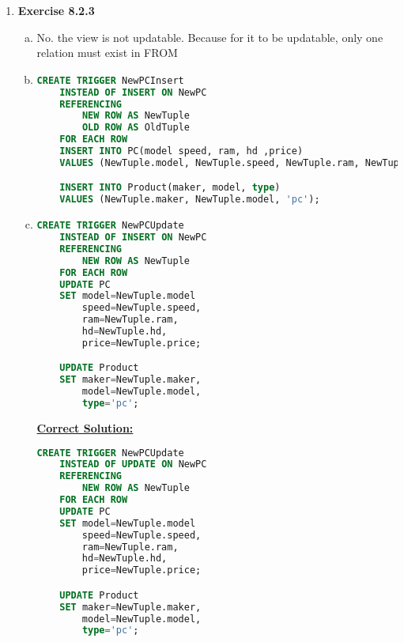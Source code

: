 \documentclass[12pt]{article}
\begin{document}
\begin{enumerate}[1.]
    \item \textbf{Exercise 8.2.3}

    \bigskip

    \begin{enumerate}[a)]
        \item No. the view is not updatable. Because for it to be updatable,
        only one relation must exist in FROM
        \item

    \begin{lstlisting}[language=SQL]
    CREATE TRIGGER NewPCInsert
    INSTEAD OF INSERT ON NewPC
    REFERENCING
        NEW ROW AS NewTuple
        OLD ROW AS OldTuple
    FOR EACH ROW
    INSERT INTO PC(model speed, ram, hd ,price)
    VALUES (NewTuple.model, NewTuple.speed, NewTuple.ram, NewTuple.hd, NewTuple.price);

    INSERT INTO Product(maker, model, type)
    VALUES (NewTuple.maker, NewTuple.model, 'pc');
    \end{lstlisting}

        \item

    \begin{lstlisting}[language=SQL]
    CREATE TRIGGER NewPCUpdate
    INSTEAD OF INSERT ON NewPC
    REFERENCING
        NEW ROW AS NewTuple
    FOR EACH ROW
    UPDATE PC
    SET model=NewTuple.model
        speed=NewTuple.speed,
        ram=NewTuple.ram,
        hd=NewTuple.hd,
        price=NewTuple.price;

    UPDATE Product
    SET maker=NewTuple.maker,
        model=NewTuple.model,
        type='pc';
    \end{lstlisting}

        \bigskip

        \begin{mdframed}
            \underline{\textbf{Correct Solution:}}

    \begin{lstlisting}[language=SQL]
    CREATE TRIGGER NewPCUpdate
    INSTEAD OF UPDATE ON NewPC
    REFERENCING
        NEW ROW AS NewTuple
    FOR EACH ROW
    UPDATE PC
    SET model=NewTuple.model
        speed=NewTuple.speed,
        ram=NewTuple.ram,
        hd=NewTuple.hd,
        price=NewTuple.price;

    UPDATE Product
    SET maker=NewTuple.maker,
        model=NewTuple.model,
        type='pc';
    \end{lstlisting}
        \end{mdframed}


\end{enumerate}
\end{enumerate}
\end{document}
